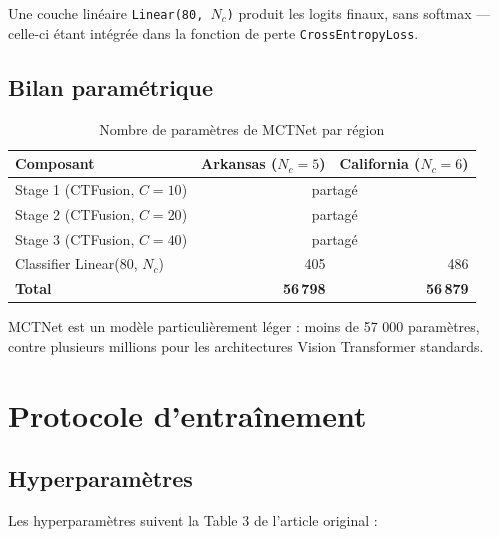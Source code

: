 Une couche linéaire \texttt{Linear(80, $N_c$)} produit les logits finaux,
sans softmax — celle-ci étant intégrée dans la fonction de perte
\texttt{CrossEntropyLoss}.

\subsection{Bilan paramétrique}

\begin{table}[H]
\centering
\caption{Nombre de paramètres de MCTNet par région}
\label{tab:params}
\begin{tabular}{lrr}
\toprule
\textbf{Composant} & \textbf{Arkansas ($N_c=5$)} & \textbf{California ($N_c=6$)} \\
\midrule
Stage 1 (CTFusion, $C=10$) & \multicolumn{2}{c}{partagé} \\
Stage 2 (CTFusion, $C=20$) & \multicolumn{2}{c}{partagé} \\
Stage 3 (CTFusion, $C=40$) & \multicolumn{2}{c}{partagé} \\
Classifier Linear(80, $N_c$) & 405 & 486 \\
\midrule
\textbf{Total} & \textbf{56\,798} & \textbf{56\,879} \\
\bottomrule
\end{tabular}
\end{table}

MCTNet est un modèle particulièrement léger : moins de 57 000 paramètres,
contre plusieurs millions pour les architectures Vision Transformer standards.

\section{Protocole d'entraînement}

\subsection{Hyperparamètres}

Les hyperparamètres suivent la Table 3 de l'article original :

